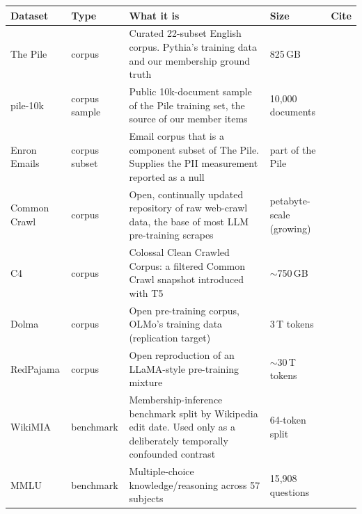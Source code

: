 \begin{table}[t]
 \centering
 \small
 \begin{tabular}{@{}llp{7cm}ll@{}}
 \toprule
 \textbf{Dataset} & \textbf{Type} & \textbf{What it is} & \textbf{Size} & \textbf{Cite} \\
 \midrule
 The Pile & corpus & Curated 22-subset English corpus. Pythia's training data and our membership ground truth & 825\,GB & \citep{gao2020pile} \\
 pile-10k & corpus sample & Public 10k-document sample of the Pile training set, the source of our member items & 10{,}000 documents & \citep{gao2020pile} \\
 Enron Emails & corpus subset & Email corpus that is a component subset of The Pile. Supplies the PII measurement reported as a null & part of the Pile & \citep{gao2020pile} \\
 Common Crawl & corpus & Open, continually updated repository of raw web-crawl data, the base of most LLM pre-training scrapes & petabyte-scale (growing) & \citep{commoncrawl} \\
 C4 & corpus & Colossal Clean Crawled Corpus: a filtered Common Crawl snapshot introduced with T5 & $\sim$750\,GB & \citep{raffel2020c4,dodge2021c4} \\
 Dolma & corpus & Open pre-training corpus, OLMo's training data (replication target) & 3\,T tokens & \citep{soldaini2024dolma} \\
 RedPajama & corpus & Open reproduction of an LLaMA-style pre-training mixture & $\sim$30\,T tokens & \citep{weber2024redpajama} \\
 WikiMIA & benchmark & Membership-inference benchmark split by Wikipedia edit date. Used only as a deliberately temporally confounded contrast & 64-token split & \citep{shi2024detecting} \\
 \midrule
 MMLU & benchmark & Multiple-choice knowledge/reasoning across 57 subjects & 15{,}908 questions & \citep{hendrycks2021mmlu} \\

\end{tabular}
\end{table}
